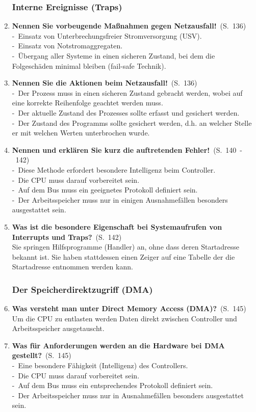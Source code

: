 \documentclass[a4paper,12pt]{article}
\newcommand{\question}[3]{\pagebreak[3]\item {\textbf{#1?}}\ (S.\ #2)#3}
\newcommand{\statement}[3]{\pagebreak[3]\item {\textbf{#1!}}\ (S.\ #2)#3}
\newcommand{\catchword}[1]{\\-\ #1}
\newcommand{\normaltext}[1]{\\#1}
\newcommand{\page}[1]{#1}
\newcommand{\pages}[2]{#1\ -\ #2}
\begin{document}
\begin{enumerate}
  \subsubsection{Interne Ereignisse (Traps)}

  \statement{Nennen Sie vorbeugende Maßnahmen gegen Netzausfall}{\page{136}}
  {
    \catchword{Einsatz von Unterbrechungsfreier Stromversorgung (USV).}
    \catchword{Einsatz von Notstromaggregaten.}
    \catchword{Übergang aller Systeme in einen sicheren Zustand, bei dem die Folgeschäden minimal
               bleiben (fail-safe Technik).}
  }

  \statement{Nennen Sie die Aktionen beim Netzausfall}{\page{136}}
  {
    \catchword{Der Prozess muss in einen sicheren Zustand gebracht werden, wobei auf eine korrekte
               Reihenfolge geachtet werden muss.}
    \catchword{Der aktuelle Zustand des Prozesses sollte erfasst und gesichert werden.}
    \catchword{Der Zustand des Programms sollte gesichert werden, d.h. an welcher Stelle er mit
               welchen Werten unterbrochen wurde.}
  }

  \statement{Nennen und erklären Sie kurz die auftretenden Fehler}{\pages{140}{142}}
  {
    \catchword{Diese Methode erfordert besondere Intelligenz beim Controller.}
    \catchword{Die CPU muss darauf vorbereitet sein.}
    \catchword{Auf dem Bus muss ein geeignetes Protokoll definiert sein.}
    \catchword{Der Arbeitsspeicher muss nur in einigen Ausnahmefällen besonders ausgestattet sein.}
  }

  \question{Was ist die besondere Eigenschaft bei Systemaufrufen von Interrupts und Traps}{\page{142}}
  {
    \normaltext{Sie springen Hilfsprogramme (Handler) an, ohne dass deren Startadresse bekannt ist.
                Sie haben stattdessen einen Zeiger auf eine Tabelle der die Startadresse
                entnommen werden kann.}
  }

  \subsubsection{Der Speicherdirektzugriff (DMA)}

  \question{Was versteht man unter Direct Memory Access (DMA)}{\page{145}}
  {
    \normaltext{Um die CPU zu entlasten werden Daten direkt zwischen Controller und Arbeitsspeicher
                ausgetauscht.}
  }

  \question{Was für Anforderungen werden an die Hardware bei DMA gestellt}{\page{145}}
  {
    \catchword{Eine besondere Fähigkeit (Intelligenz) des Controllers.}
    \catchword{Die CPU muss darauf vorbereitet sein.}
    \catchword{Auf dem Bus muss ein entsprechendes Protokoll definiert sein.}
    \catchword{Der Arbeitsspeicher muss nur in Ausnahmefällen besonders ausgestattet sein.}
  }


\end{enumerate}
\end{document}
